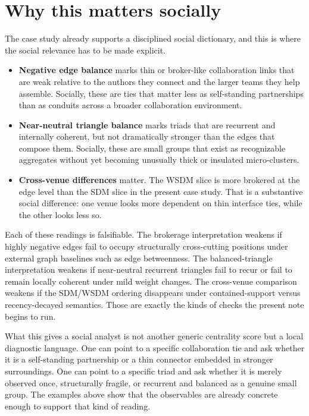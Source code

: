 \documentclass[11pt]{article}
\begin{document}
\section{Why this matters socially}

The case study already supports a disciplined social dictionary, and this is where the social relevance has to be made explicit.

\begin{itemize}
    \item \textbf{Negative edge balance} marks thin or broker-like collaboration links that are weak relative to the authors they connect and the larger teams they help assemble. Socially, these are ties that matter less as self-standing partnerships than as conduits across a broader collaboration environment.
    \item \textbf{Near-neutral triangle balance} marks triads that are recurrent and internally coherent, but not dramatically stronger than the edges that compose them. Socially, these are small groups that exist as recognizable aggregates without yet becoming unusually thick or insulated micro-clusters.
    \item \textbf{Cross-venue differences} matter. The WSDM slice is more brokered at the edge level than the SDM slice in the present case study. That is a substantive social difference: one venue looks more dependent on thin interface ties, while the other looks less so.
\end{itemize}

Each of these readings is falsifiable. The brokerage interpretation weakens if highly negative edges fail to occupy structurally cross-cutting positions under external graph baselines such as edge betweenness. The balanced-triangle interpretation weakens if near-neutral recurrent triangles fail to recur or fail to remain locally coherent under mild weight changes. The cross-venue comparison weakens if the SDM/WSDM ordering disappears under contained-support versus recency-decayed semantics. Those are exactly the kinds of checks the present note begins to run.

What this gives a social analyst is not another generic centrality score but a local diagnostic language. One can point to a specific collaboration tie and ask whether it is a self-standing partnership or a thin connector embedded in stronger surroundings. One can point to a specific triad and ask whether it is merely observed once, structurally fragile, or recurrent and balanced as a genuine small group. The examples above show that the observables are already concrete enough to support that kind of reading.
\end{document}
